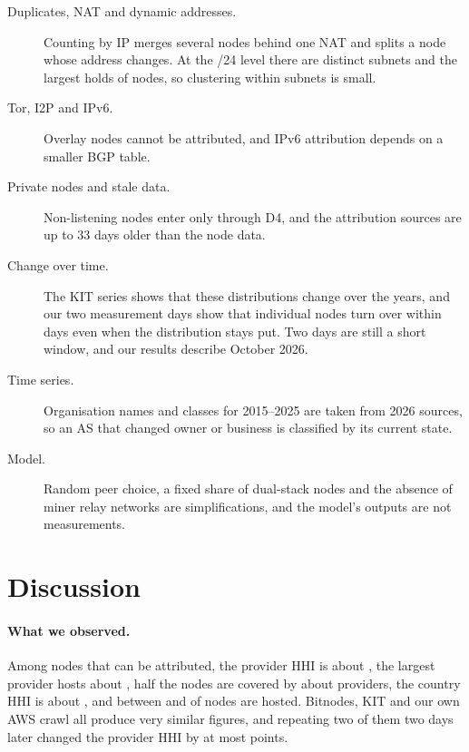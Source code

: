 \documentclass[10pt,a4paper]{article}
\begin{document}
\begin{description}
\item[Duplicates, NAT and dynamic addresses.] Counting by IP merges several nodes behind one NAT and splits a node whose address changes. At the /24 level there are \DtwoFSubnetGroups{} distinct subnets and the largest holds \DtwoFSubnetTopone{} of nodes, so clustering within subnets is small.
\item[Tor, I2P and IPv6.] Overlay nodes cannot be attributed, and IPv6 attribution depends on a smaller BGP table.
\item[Private nodes and stale data.] Non-listening nodes enter only through D4, and the attribution sources are up to 33 days older than the node data.
\item[Change over time.] The KIT series shows that these distributions change over the years, and our two measurement days show that individual nodes turn over within days even when the distribution stays put. Two days are still a short window, and our results describe October 2026.
\item[Time series.] Organisation names and classes for 2015--2025 are taken from 2026 sources, so an AS that changed owner or business is classified by its current state.
\item[Model.] Random peer choice, a fixed share of dual-stack nodes and the absence of miner relay networks are simplifications, and the model's outputs are not measurements.
\end{description}

\section{Discussion}\label{sec:discussion}

\paragraph{What we observed.} Among nodes that can be attributed, the provider HHI is about \DtwoFProvHHI{}, the largest provider hosts about \DtwoFProvTopone{}, half the nodes are covered by about \DtwoFProvNfifty{} providers, the country HHI is about \DtwoFCcHHI{}, and between \DtwoFHostedLow{} and \DtwoFHostedHigh{} of nodes are hosted. Bitnodes, KIT and our own AWS crawl all produce very similar figures, and repeating two of them two days later changed the provider HHI by at most \TdMaxProvHHIChange{} points.
\end{document}
